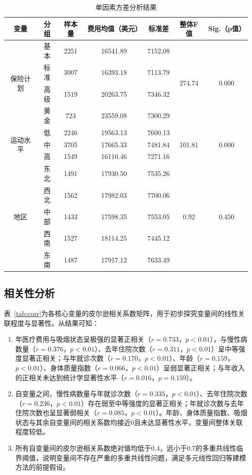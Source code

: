 \documentclass[a4paper]{ctexart}
\begin{document}
\begin{table}[H]
\centering
\caption{单因素方差分析结果}
\label{tab:anova}
\begin{tabular}{ccccccc}
\toprule
变量 & 分组 & 样本量 & 费用均值（美元） & 标准差 & 整体F值 & Sig.（p值） \\
\midrule
\multirow{4}{*}{保险计划} & 基本 & 2251 & 16541.89 & 7152.08 & \multirow{4}{*}{274.74} & \multirow{4}{*}{0.000} \\
& 标准 & 3007 & 16393.18 & 7113.79 & & \\
& 高级 & 1519 & 20263.75 & 7346.32 & & \\
& 黄金 & 723 & 23559.08 & 7300.29 & & \\
\midrule
\multirow{3}{*}{运动水平} & 低 & 2246 & 19563.13 & 7600.13 & \multirow{3}{*}{101.81} & \multirow{3}{*}{0.000} \\
& 中 & 3705 & 17665.33 & 7481.84 & & \\
& 高 & 1549 & 16110.46 & 7271.16 & & \\
\midrule
\multirow{5}{*}{地区} & 东北 & 1491 & 17930.50 & 7535.26 & \multirow{5}{*}{0.92} & \multirow{5}{*}{0.450} \\
& 西北 & 1562 & 17982.03 & 7700.06 & & \\
& 中部 & 1433 & 17598.35 & 7553.05 & & \\
& 西南 & 1527 & 18114.25 & 7445.12 & & \\
& 东南 & 1487 & 17917.12 & 7633.49 & & \\
\bottomrule
\end{tabular}
\end{table}

\subsection{相关性分析}

表~\ref{tab:corr}为各核心变量的皮尔逊相关系数矩阵，用于初步探究变量间的线性关联程度与显著性。从结果可知：
\begin{enumerate}[(1)]
\item 年医疗费用与吸烟状态呈极强的显著正相关（\(r=0.733\)，\(p<0.01\)），与慢性病数量（\(r=0.376\)，\(p<0.01\)）、去年住院次数（\(r=0.311\)，\(p<0.01\)）呈中等强度显著正相关；与年就诊次数（\(r=0.170\)，\(p<0.01\)）、年龄（\(r=0.159\)，\(p<0.01\)）、身体质量指数（\(r=0.066\)，\(p<0.01\)）呈弱显著正相关；与年收入的正相关未达到统计学显著性水平（\(r=0.016\)，\(p=0.159\)）。

\item 自变量之间，慢性病数量与年就诊次数（\(r=0.335\)，\(p<0.01\)）、去年住院次数（\(r=0.236\)，\(p<0.01\)）存在弱至中等强度的显著正相关；年就诊次数与去年住院次数也呈显著弱相关（\(r=0.085\)，\(p<0.01\)）。年龄、身体质量指数、吸烟状态与其余自变量间的相关系数均接近0且未达显著性水平，变量间整体关联程度较低。

\item 所有自变量间的皮尔逊相关系数绝对值均低于0.4，远小于0.7的多重共线性临界阈值，说明变量间不存在严重的多重共线性问题，满足多元线性回归等建模方法的前提假设。
\end{enumerate}
\end{document}
